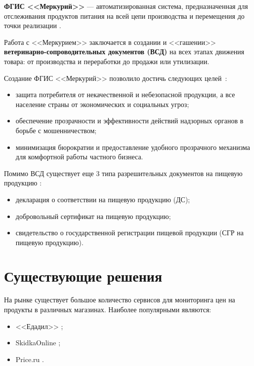 \textbf{ФГИС <<Меркурий>>} --- автоматизированная система, предназначенная для отслеживания продуктов питания на всей цепи производства и перемещения до точки реализации \cite{info_mercury}.

Работа с <<Меркурием>> заключается в создании и <<гашении>> \textbf{ветеринарно-сопроводительных документов (ВСД)} на всех этапах движения товара: от производства и переработки до продажи или утилизации.

Создание ФГИС <<Меркурий>> позволило достичь следующих целей~\cite{info_mercury, info_mercury2}:

\begin{itemize}[label=--]
	\item защита потребителя от некачественной и небезопасной продукции, а все население страны от экономических и социальных угроз;
	\item обеспечение прозрачности и эффективности действий надзорных органов в борьбе с мошенничеством;
	\item минимизация бюрократии и предоставление удобного прозрачного механизма для комфортной работы частного бизнеса.
\end{itemize}

\clearpage 

Помимо ВСД существует еще 3 типа разрешительных документов на пищевую продукцию \cite{info_certificates}: 

\begin{itemize}[label*=--]
	\item декларация о соответствии на пищевую продукцию (ДС);
	\item добровольный сертификат на пищевую продукцию;
	\item свидетельство о государственной регистрации пищевой продукции (СГР на пищевую продукцию).
\end{itemize}

\section{Существующие решения}

На рынке существует большое количество сервисов для мониторинга цен на продукты в различных магазинах. Наиболее популярными являются:

\begin{itemize}[label=--]
	\item <<Едадил>> \cite{info_edadil};
	\item SkidkaOnline \cite{info_skidka_online};
	\item Price.ru \cite{info_price_ru}.
\end{itemize}

